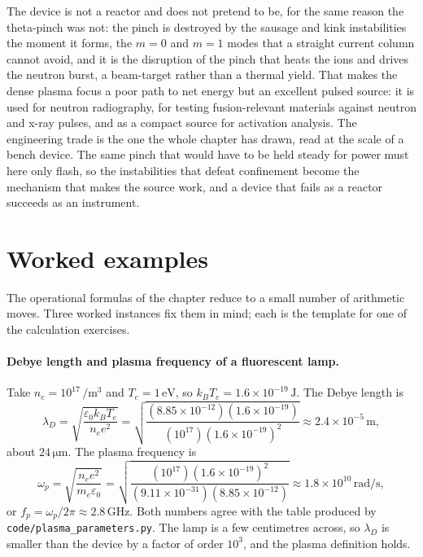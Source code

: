 The device is not a reactor and does not pretend to be, for the same reason
the theta-pinch was not: the pinch is destroyed by the sausage and kink
instabilities the moment it forms, the $m=0$ and $m=1$ modes that a straight
current column cannot avoid, and it is the disruption of the pinch that heats
the ions and drives the neutron burst, a beam-target rather than a thermal
yield. That makes the dense plasma focus a poor path to net energy but an
excellent pulsed source: it is used for neutron radiography, for testing
fusion-relevant materials against neutron and x-ray pulses, and as a compact
source for activation analysis. The engineering trade is the one the whole
chapter has drawn, read at the scale of a bench device. The same pinch that
would have to be held steady for power must here only flash, so the
instabilities that defeat confinement become the mechanism that makes the
source work, and a device that fails as a reactor succeeds as an instrument.

\section{Worked examples}

The operational formulas of the chapter reduce to a small number of
arithmetic moves. Three worked instances fix them in mind; each is the
template for one of the calculation exercises.

\paragraph{Debye length and plasma frequency of a fluorescent lamp.}
Take $n_{e} = 10^{17}\,\si{\per\cubic\meter}$ and $T_{e} = 1\,\si{
\electronvolt}$, so $k_{B}T_{e} = 1.6\times 10^{-19}\,\si{\joule}$. The
Debye length is
\[
\lambda_{D} = \sqrt{\frac{\varepsilon_{0}k_{B}T_{e}}{n_{e}e^{2}}}
= \sqrt{\frac{(8.85\times 10^{-12})(1.6\times 10^{-19})}
{(10^{17})(1.6\times 10^{-19})^{2}}}
\approx 2.4\times 10^{-5}\,\si{\meter},
\]
about $24\,\si{\micro\meter}$. The plasma frequency is
\[
\omega_{p} = \sqrt{\frac{n_{e}e^{2}}{m_{e}\varepsilon_{0}}}
= \sqrt{\frac{(10^{17})(1.6\times 10^{-19})^{2}}
{(9.11\times 10^{-31})(8.85\times 10^{-12})}}
\approx 1.8\times 10^{10}\,\si{\radian\per\second},
\]
or $f_{p} = \omega_{p}/2\pi \approx 2.8\,\si{\giga\hertz}$. Both numbers
agree with the table produced by \texttt{code/plasma\_parameters.py}. The
lamp is a few centimetres across, so $\lambda_{D}$ is smaller than the
device by a factor of order $10^{3}$, and the plasma definition holds.

